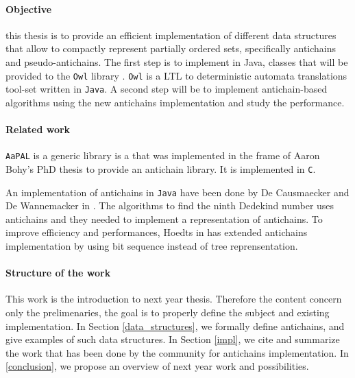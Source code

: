 \documentclass[letterpaper]{article}
\theoremstyle{definition}
\begin{document}
\paragraph{Objective}

this thesis is to provide an efficient implementation of different
data structures that allow to compactly
represent partially ordered sets, specifically antichains and pseudo-antichains.
The first step is to implement in Java, classes that will be provided to
the \texttt{Owl} library \cite{owl}.
\texttt{Owl} is a LTL to deterministic automata translations tool-set written
in \texttt{Java}. A second step will be to implement
antichain-based algorithms using the new antichains implementation and
study the performance.

\paragraph{Related work}



\texttt{AaPAL} is a generic
library is a that was implemented in the frame of
Aaron Bohy's PhD thesis \cite{bohy_phd}
to provide an antichain library. It is implemented in \texttt{C}.

An implementation of antichains in \texttt{Java} have been done
by De Causmaecker and De Wannemacker in \cite{causemaecker1}. The algorithms
to find the ninth Dedekind number uses antichains and they needed to
implement a representation of antichains.
To improve efficiency and performances, Hoedts in \cite{hoedt} has extended
\cite{causemaecker1} antichains implementation by using bit sequence
instead of tree reprensentation.


\paragraph{Structure of the work}

This work is the introduction to next year thesis. Therefore
the content concern only the prelimenaries, the goal is to
properly define the subject and existing implementation.
In Section \ref{data_structures}, we formally define antichains,
and give examples of such data structures. In Section \ref{impl},
we cite and summarize the work that has been done by the community
for antichains implementation. In \ref{conclusion}, we propose
an overview of next year work and possibilities.
\end{document}
